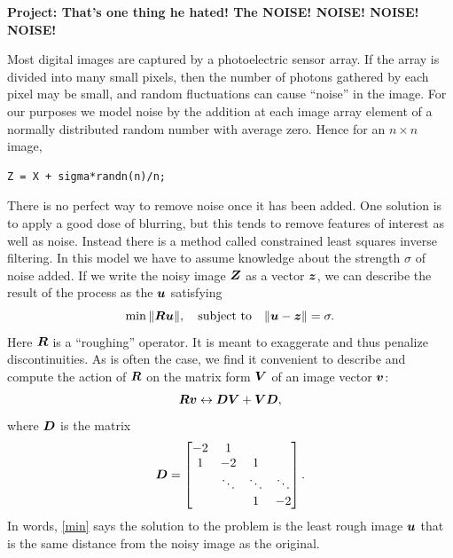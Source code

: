 \documentclass[11pt]{article}
\begin{document}
\begin{center}
  \bf Project: That's one thing he hated! The
  NOISE! NOISE! NOISE! NOISE!   
\end{center}

Most digital images are captured by a photoelectric sensor array. If
the array is divided into many small pixels, then the number of
photons gathered by each pixel may be small, and random fluctuations
can cause ``noise'' in the image. For our purposes we model noise by
the addition at each image array element of a normally distributed
random number with average zero. Hence for an $n\times n$ image,
\begin{verbatim}
Z = X + sigma*randn(n)/n;
\end{verbatim}

There is no perfect way to remove noise once it has been added. One
solution is to apply a good dose of blurring, but this tends to remove
features of interest as well as noise. Instead there is a method
called constrained least squares inverse filtering. In this model we
have to assume knowledge about the strength $\sigma$ of noise
added. If we write the noisy image $\bm{Z}$ as a vector $\bm{z}$, we can
describe the result of the process as the $\bm{u}$ satisfying
\begin{equation}
  \label{min}
  \min \| \bm{R}\bm{u} \|, \quad \text{subject to} \quad \| \bm{u} - \bm{z} \| = \sigma.
\end{equation}
Here $\bm{R}$ is a ``roughing'' operator. It is meant to exaggerate and
thus penalize discontinuities. As is often the case, we find it
convenient to describe and compute the action of $\bm{R}$ on the matrix
form $\bm{V}$ of an image vector $\bm{v}$:
\begin{equation}
  \label{rough}
  \bm{R}\bm{v} \leftrightarrow \bm{D}\bm{V} + \bm{V}\bm{D},
\end{equation}
where $\bm{D}$ is the matrix
\begin{equation}
  \bm{D} = 
  \begin{bmatrix}
    -2 & 1 & & \\
    1 & -2 & 1 & \\
    & \ddots & \ddots & \ddots \\
    & & 1 & -2
  \end{bmatrix}.
\end{equation}
In words, \eqref{min} says the solution to the problem is the least rough
image $\bm{u}$ that is the same distance from the noisy image as the
original.
\end{document}
